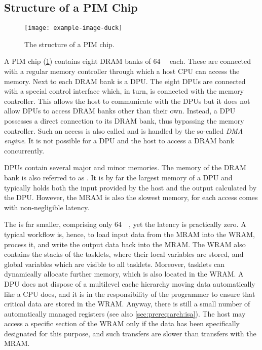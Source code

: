 \subsection{Structure of a \ac*{PIM} Chip}
\label{sec:prereq:arch:structure}

\begin{figure}
	\centering
	\texttt{[image: example-image-duck]}

	\caption{
		The structure of a \ac{PIM} chip.
	}
	\label{fig:arch:chip}
\end{figure}

A \ac{PIM} chip (\cref{fig:arch:chip}) contains eight \ac{DRAM} banks of \qty{64}{\mebi\byte} each.
These are connected with a regular memory controller through which a host \ac{CPU} can access the memory.
Next to each \ac{DRAM} bank is a \ac{DPU}.
The eight \acp{DPU} are connected with a special control interface which, in turn, is connected with the memory controller.
This allows the host to communicate with the \acp{DPU} but it does not allow \acp{DPU} to access \ac{DRAM} banks other than their own.
Instead, a \ac{DPU} possesses a direct connection to its \ac{DRAM} bank, thus bypassing the memory controller.
Such an access is also called  and is handled by the so-called \emph{\ac{DMA} engine}.
It is not possible for a \ac{DPU} and the host to access a \ac{DRAM} bank concurrently.

\Acp{DPU} contain several major and minor memories.
The memory of the \ac{DRAM} bank is also referred to as .
It is by far the largest memory of a \ac{DPU} and typically holds both the input provided by the host and the output calculated by the \ac{DPU}.
However, the \ac{MRAM} is also the slowest memory, for each access comes with non-negligible latency.

The  is far smaller, comprising only \qty{64}{\kibi\byte}, yet the latency is practically zero.
A typical workflow is, hence, to load input data from the \ac{MRAM} into the \ac{WRAM}, process it, and write the output data back into the \ac{MRAM}.
The \ac{WRAM} also contains the stacks of the tasklets, where their local variables are stored, and global variables which are visible to all tasklets.
Moreover, tasklets can dynamically allocate further memory, which is also located in the \ac{WRAM}.
A \ac{DPU} does not dispose of a multilevel cache hierarchy moving data automatically like a \ac{CPU} does, and it is in the responsibility of the programmer to ensure that critical data are stored in the \ac{WRAM}.
Anyway, there is still a small number of automatically managed registers (see also \cref{sec:prereq:arch:isa}).
The host may access a specific section of the \ac{WRAM} only if the data has been specifically designated for this purpose, and such transfers are slower than transfers with the \ac{MRAM}.


